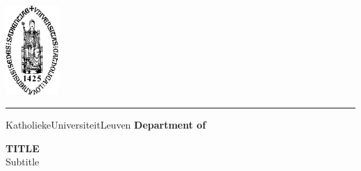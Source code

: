\begin{titlepage}
    \newpage
    \thispagestyle{empty}
    \frenchspacing
    \hspace{-0.2cm}
    \includegraphics[height=3.4cm]{sedes}
    \hspace{0.2cm}
    \rule{0.5pt}{3.4cm}
    \hspace{0.2cm}
    \begin{minipage}[b]{8cm}
        \Large{Katholieke\newline Universiteit\newline Leuven}\smallskip\newline
        \large{}\smallskip\newline
        \textbf{Department of \newline }\smallskip
    \end{minipage}
    \vspace*{3.2cm}\vfill
    \begin{center}
        \begin{minipage}[t]{\textwidth}
            \begin{center}
                \LARGE{\rm{\textbf{\uppercase{Title}}}}\\
                \Large{\rm{Subtitle}}
            \end{center}
        \end{minipage}
    \end{center}
    \vfill
    \hfill{}
\end{titlepage}
